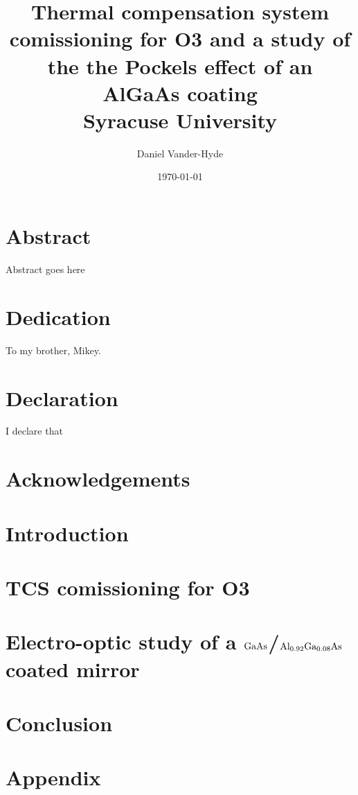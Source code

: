 \documentclass[12pt]{report}
\title{
{Thermal compensation system comissioning for O3 and a study of the
the Pockels effect of an AlGaAs coating}\\
{\large Syracuse University}\\
}
\author{Daniel Vander-Hyde}
\date{\today}
\newcommand{\algaas}{\mathrm{Al_{0.92}Ga_{0.08}As}}
\newcommand{\gaas}{\mathrm{GaAs}}
\begin{document}
\maketitle

\chapter*{Abstract}
Abstract goes here

\chapter*{Dedication}
To my brother, Mikey.

\chapter*{Declaration}
I declare that

\chapter*{Acknowledgements}


\tableofcontents

\maketitle

\newpage


\chapter{Introduction}

\newpage

\chapter{TCS comissioning for O3}


\chapter{Electro-optic study of a $\protect\gaas$/$\protect\algaas$ coated mirror}


\chapter{Conclusion}



\newpage
\chapter{Appendix}




\end{document}
